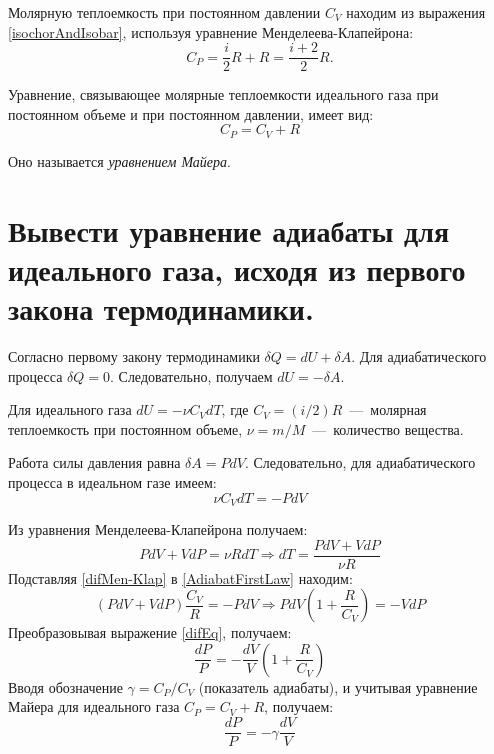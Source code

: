 Молярную теплоемкость при постоянном давлении $C_V$ находим из выражения \ref{isochorAndIsobar}, используя уравнение Менделеева-Клапейрона:
\begin{equation}
  C_P = \frac{i}{2} R + R = \frac{i+2}{2}R.
\end{equation}

Уравнение, связывающее молярные теплоемкости идеального газа при
постоянном объеме и при постоянном давлении, имеет вид:
\begin{equation}
  C_P = C_V + R
\end{equation}

Оно называется \emph{уравнением Майера}.

\section{Вывести уравнение адиабаты для идеального газа, исходя из
первого закона термодинамики.}

\solving{}

Согласно первому закону термодинамики $\delta Q = dU +\delta A$.
Для адиабатического процесса $\delta Q = 0$.
Следовательно, получаем $dU = -\delta A$.

Для идеального газа $dU = -\nu C_V dT$, где $C_V = (i/2)R$~---~молярная теплоемкость при
постоянном объеме, $\nu = m/M$~---~количество вещества.

Работа силы давления равна $\delta A = PdV$. Следовательно, для
адиабатического процесса в идеальном газе имеем:
\begin{equation} \label{AdiabatFirstLaw}
  \nu C_V dT = -PdV
\end{equation}

Из уравнения Менделеева-Клапейрона получаем:
\begin{equation} \label{difMen-Klap}
  PdV + VdP = \nu RdT \Rightarrow dT = \frac{PdV + VdP}{\nu R}
\end{equation}
Подставляя \ref{difMen-Klap} в \ref{AdiabatFirstLaw} находим:
\begin{equation} \label{difEq}
  (PdV + VdP)\frac{C_V}{R} = -PdV \Rightarrow PdV(1+\frac{R}{C_V}) = - VdP
\end{equation}
Преобразовывая выражение \ref{difEq}, получаем:
\begin{equation}
  \frac{dP}{P} = -\frac{dV}{V} \left ( 1+ \frac{R}{C_V}\right )
\end{equation}
Вводя обозначение $\gamma = C_P/C_V$ (показатель адиабаты), и учитывая уравнение Майера для идеального газа $C_P = C_V + R$, получаем:
\begin{equation} \label{difEq2}
  \frac{dP}{P} = -\gamma \frac{dV}{V}
\end{equation}

